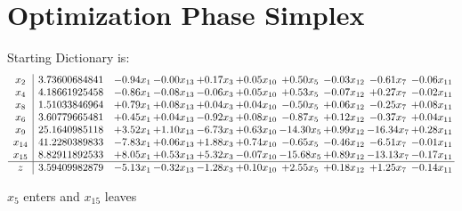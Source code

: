 \documentclass[9pt]{article}
\begin{document}
\section{Optimization Phase Simplex}
Starting Dictionary is:
\[\begin{array}{c| c c@{\hskip 2pt} c@{\hskip 2pt} c@{\hskip 2pt} c@{\hskip 2pt} c@{\hskip 2pt} c@{\hskip 2pt} c@{\hskip 2pt} c@{\hskip 2pt} }
 x_{2}   &  3.73600684841 & -0.94 x_{1} & -0.00 x_{13} & +  0.17 x_{3} & +  0.05 x_{10} & +  0.50 x_{5} & -0.03 x_{12} & -0.61 x_{7} & -0.06 x_{11}\\
 x_{4}   &  4.18661925458 & -0.86 x_{1} & -0.08 x_{13} & -0.06 x_{3} & +  0.05 x_{10} & +  0.53 x_{5} & -0.07 x_{12} & +  0.27 x_{7} & -0.02 x_{11}\\
 x_{8}   &  1.51033846964 & +  0.79 x_{1} & +  0.08 x_{13} & +  0.04 x_{3} & +  0.04 x_{10} & -0.50 x_{5} & +  0.06 x_{12} & -0.25 x_{7} & +  0.08 x_{11}\\
 x_{6}   &  3.60779665481 & +  0.45 x_{1} & +  0.04 x_{13} & -0.92 x_{3} & +  0.08 x_{10} & -0.87 x_{5} & +  0.12 x_{12} & -0.37 x_{7} & +  0.04 x_{11}\\
 x_{9}   &  25.1640985118 & +  3.52 x_{1} & +  1.10 x_{13} & -6.73 x_{3} & +  0.63 x_{10} & -14.30 x_{5} & +  0.99 x_{12} & -16.34 x_{7} & +  0.28 x_{11}\\
 x_{14}   &  41.2280389833 & -7.83 x_{1} & +  0.06 x_{13} & +  1.88 x_{3} & +  0.74 x_{10} & -0.65 x_{5} & -0.46 x_{12} & -6.51 x_{7} & -0.01 x_{11}\\
 x_{15}   &  8.82911892533 & +  8.05 x_{1} & +  0.53 x_{13} & +  5.32 x_{3} & -0.07 x_{10} & -15.68 x_{5} & +  0.89 x_{12} & -13.13 x_{7} & -0.17 x_{11}\\
\hline
z    &  3.59409982879 & -5.13 x_{1} & -0.32 x_{13} & -1.28 x_{3} & +  0.10 x_{10} & +  2.55 x_{5} & +  0.18 x_{12} & +  1.25 x_{7} & -0.14 x_{11}\\
\end{array}\]


 $ x_{5} $ enters and $ x_{15} $ leaves 
\end{document}
